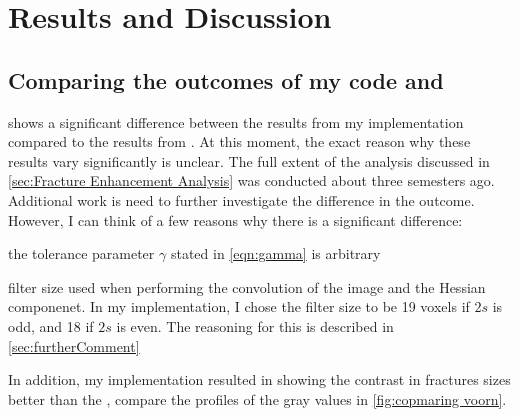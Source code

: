 \documentclass{edger}
\begin{document}

\section{Results and Discussion}
\subsection{Comparing the outcomes of my code and \texorpdfstring{\cite{Voorn2013}}{Voorn et al. (2013)}} \label{sec:results comparing my outcome and voorns}
 shows a significant difference between the results from my implementation compared to the results from \cite{Voorn2013}. At this moment, the exact reason why these results vary significantly is unclear. The full extent of the analysis discussed in \autoref{sec:Fracture Enhancement Analysis} was conducted about three semesters ago. Additional work is need to further investigate the difference in the outcome. However, I can think of a few reasons why there is a significant difference:
\begin{tight_itemize}
\item the tolerance parameter $\gamma$ stated in \autoref{eqn:gamma} is arbitrary
\item filter size used when performing the convolution of the image and the Hessian componenet. In my implementation, I chose the filter size to be 19 voxels if $2s$ is odd, and 18 if $2s$ is even. The reasoning for this is described in  \autoref{sec:furtherComment}
\end{tight_itemize}

In addition, my implementation resulted in showing the contrast in fractures sizes better than the \cite{Voorn2013}, compare the profiles of the gray values in \autoref{fig:copmaring voorn}. 
\end{document}
